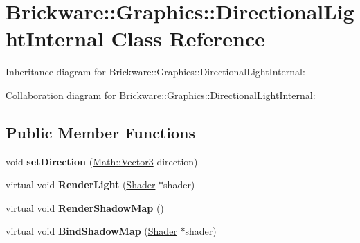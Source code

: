 \hypertarget{classBrickware_1_1Graphics_1_1DirectionalLightInternal}{}\section{Brickware\+:\+:Graphics\+:\+:Directional\+Light\+Internal Class Reference}
\label{classBrickware_1_1Graphics_1_1DirectionalLightInternal}


Inheritance diagram for Brickware\+:\+:Graphics\+:\+:Directional\+Light\+Internal\+:


Collaboration diagram for Brickware\+:\+:Graphics\+:\+:Directional\+Light\+Internal\+:
\subsection*{Public Member Functions}
\begin{DoxyCompactItemize}
\item 
\hypertarget{classBrickware_1_1Graphics_1_1DirectionalLightInternal_a04aefe97c5acc860643e8421eec162d1}{}void {\bfseries set\+Direction} (\hyperlink{classBrickware_1_1Math_1_1Vector3}{Math\+::\+Vector3} direction)\label{classBrickware_1_1Graphics_1_1DirectionalLightInternal_a04aefe97c5acc860643e8421eec162d1}

\item 
\hypertarget{classBrickware_1_1Graphics_1_1DirectionalLightInternal_ad2ed2e16c172b53e21be581146a6ba48}{}virtual void {\bfseries Render\+Light} (\hyperlink{classBrickware_1_1Graphics_1_1Shader}{Shader} $\ast$shader)\label{classBrickware_1_1Graphics_1_1DirectionalLightInternal_ad2ed2e16c172b53e21be581146a6ba48}

\item 
\hypertarget{classBrickware_1_1Graphics_1_1DirectionalLightInternal_a5909207d034919287c69ee7f65bc24e9}{}virtual void {\bfseries Render\+Shadow\+Map} ()\label{classBrickware_1_1Graphics_1_1DirectionalLightInternal_a5909207d034919287c69ee7f65bc24e9}

\item 
\hypertarget{classBrickware_1_1Graphics_1_1DirectionalLightInternal_ab3e8b544616cb2290913cb07df411b23}{}virtual void {\bfseries Bind\+Shadow\+Map} (\hyperlink{classBrickware_1_1Graphics_1_1Shader}{Shader} $\ast$shader)\label{classBrickware_1_1Graphics_1_1DirectionalLightInternal_ab3e8b544616cb2290913cb07df411b23}

\end{DoxyCompactItemize}
